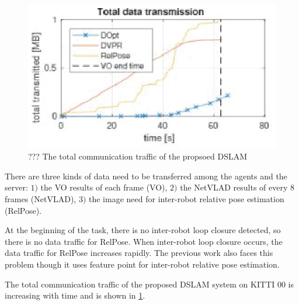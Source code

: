 \begin{figure}[thb]
  \centering  
  \includegraphics[width=0.85\linewidth]{fig/data.eps}
  \caption{??? The total communication traffic of the propsoed DSLAM}
  \label{fig:data}
\end{figure}

There are three kinds of data need to be transferred among the agents and the server: $1)$ the VO results of each frame (VO), $2)$ the NetVLAD results of every $8$ frames (NetVLAD), $3)$ the image need for inter-robot relative pose estimation (RelPose).

At the beginning of the task, there is no inter-robot loop closure detected, so there is no data traffic for RelPose. When inter-robot loop closure occurs, the data traffic for RelPose increases rapidly. The previous work\cite{Cieslewski:20187ee} also faces this problem though it uses feature point for inter-robot relative pose estimation.


The total communication traffic of the proposed DSLAM system on KITTI 00 is increasing with time and is shown in \cref{fig:data}.
